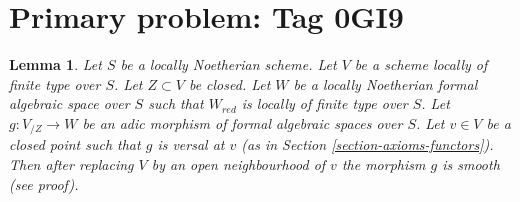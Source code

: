 \documentclass{amsart}
\theoremstyle{plain}
\newtheorem{lemma}[subsection]{Lemma}
\theoremstyle{definition}
\theoremstyle{remark}
\numberwithin{equation}{subsection}
\begin{document}
\section*{Primary problem: Tag 0GI9}
\begin{lemma}
\label{lemma-openness-smoothness}
Let $S$ be a locally Noetherian scheme. Let $V$ be a scheme locally
of finite type over $S$. Let $Z \subset V$ be closed. Let $W$ be
a locally Noetherian formal algebraic space over $S$ such that
$W_{red}$ is locally of finite type over $S$. Let $g : V_{/Z} \to W$
be an adic morphism of formal algebraic spaces over $S$. Let $v \in V$
be a closed point such that $g$ is versal at $v$ (as in
Section \ref{section-axioms-functors}).
Then after replacing $V$ by an open neighbourhood of $v$ the
morphism $g$ is smooth (see proof).
\end{lemma}
\end{document}

